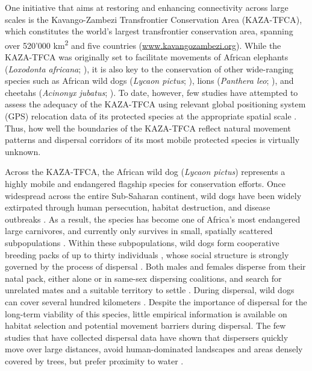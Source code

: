 \documentclass[abstract=on,10pt,a4paper,bibliography=totocnumbered]{article}
\begin{document}
One initiative that aims at restoring and enhancing connectivity across large
scales is the Kavango-Zambezi Transfrontier Conservation Area (KAZA-TFCA), which
constitutes the world's largest transfrontier conservation area, spanning over
520'000 km\textsuperscript{2} and five countries (\url{www.kavangozambezi.org}).
While the KAZA-TFCA was originally set to facilitate movements of African
elephants (\textit{Loxodonta africana}; \citealp{Tshipa.2017}), it is also key
to the conservation of other wide-ranging species such as African wild dogs
(\textit{Lycaon pictus}; \citealp{Woodroffe.2012, Cozzi.2020}), lions
(\textit{Panthera leo}; \citealp{Elliot.2014, Cushman.2018}), and cheetahs
(\textit{Acinonyx jubatus}; \citealp{Weise.2017}). To date, however, few studies
have attempted to assess the adequacy of the KAZA-TFCA using relevant global
positioning system (GPS) relocation data of its protected species at the
appropriate spatial scale \citep{Elliot.2014, Tshipa.2017}. Thus, how well the
boundaries of the KAZA-TFCA reflect natural movement patterns and dispersal
corridors of its most mobile protected species is virtually unknown.

Across the KAZA-TFCA, the African wild dog (\textit{Lycaon pictus}) represents a
highly mobile and endangered flagship species for conservation efforts. Once
widespread across the entire Sub-Saharan continent, wild dogs have been widely
extirpated through human persecution, habitat destruction, and disease outbreaks
\citep{Woodroffe.2012}. As a result, the species has become one of Africa's most
endangered large carnivores, and currently only survives in small, spatially
scattered subpopulations \citep{Woodroffe.2012}. Within these subpopulations,
wild dogs form cooperative breeding packs of up to thirty individuals
\citep{Creel.2002}, whose social structure is strongly governed by the process
of dispersal \citep{McNutt.1996, Behr.2020}. Both males and females disperse
from their natal pack, either alone or in same-sex dispersing coalitions, and
search for unrelated mates and a suitable territory to settle
\citep{McNutt.1996, Cozzi.2020, Behr.2020}. During dispersal, wild dogs can
cover several hundred kilometers \citep{Masenga.2016, Woodroffe.2019,
Cozzi.2020}. Despite the importance of dispersal for the long-term viability of
this species, little empirical information is available on habitat selection and
potential movement barriers during dispersal. The few studies that have
collected dispersal data have shown that dispersers quickly move over large
distances, avoid human-dominated landscapes and areas densely covered by trees,
but prefer proximity to water \citep{Masenga.2016, Woodroffe.2019, Oneill.2020,
Cozzi.2020}.
\end{document}
